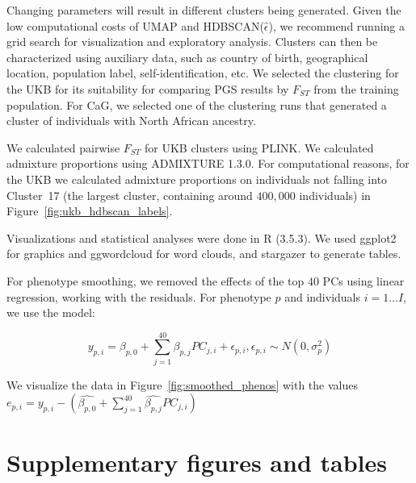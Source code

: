 Changing parameters will result in different clusters being generated. Given the low computational costs of UMAP and HDBSCAN($\hat{\epsilon}$), we recommend running a grid search for visualization and exploratory analysis. Clusters can then be characterized using auxiliary data, such as country of birth, geographical location, population label, self-identification, etc. We selected the clustering for the UKB for its suitability for comparing PGS results by $F_{ST}$ from the training population. For CaG, we selected one of the clustering runs that generated a cluster of individuals with North African ancestry.

We calculated pairwise $F_{ST}$ for UKB clusters using PLINK\citep{purcell_plink_2007}. We calculated admixture proportions using ADMIXTURE 1.3.0\citep{alexander_fast_2009}. For computational reasons, for the UKB we calculated admixture proportions on individuals not falling into Cluster~17 (the largest cluster, containing around $400,000$ individuals) in Figure~\ref{fig:ukb_hdbscan_labels}.

Visualizations and statistical analyses were done in R (3.5.3)\citep{r_2018}. We used ggplot2\citep{wickham_2016} for graphics and ggwordcloud for word clouds, and stargazer\citep{Hlavac2018-fy} to generate tables.

For phenotype smoothing, we removed the effects of the top $40$ PCs using linear regression, working with the residuals. For phenotype $p$ and individuals $i=1 \dots I$, we use the model:

$$ y_{p,i} = \beta_{p,0} + \sum_{j=1}^{40}\beta_{p,j}PC_{j,i} + \epsilon_{p,i},  \epsilon_{p,i} \sim N(0,\sigma^2_{p}) $$

We visualize the data in Figure~\ref{fig:smoothed_phenos} with the values $ e_{p,i} = y_{p,i} - (\hat{\beta_{p,0}} + \sum_{j=1}^{40}\hat{\beta_{p,j}}PC_{j,i}) $



\clearpage

\section{Supplementary figures and tables}

